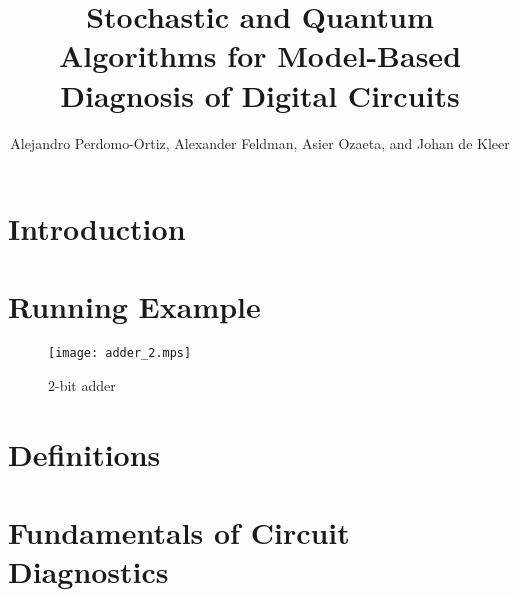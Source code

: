 \documentclass{article}
\title{Stochastic and Quantum Algorithms for Model-Based Diagnosis of Digital Circuits}
\author{Alejandro Perdomo-Ortiz, Alexander Feldman, Asier Ozaeta, and Johan de Kleer}
\begin{document}
\maketitle
\section{Introduction}
\section{Running Example}

\begin{figure}[htb]
\centering
\texttt{[image: adder\_2.mps]}
\caption{$2$-bit adder\label{fig:adder}}
\end{figure}

\section{Definitions}

\begin{definition}
\end{definition}

\begin{definition}
\end{definition}

\begin{definition}[observation]
\end{definition}

\begin{definition}[diagnosis]
\end{definition}

\begin{definition}
\end{definition}

\begin{definition}
\end{definition}

\begin{definition}
\end{definition}

\begin{definition}
\end{definition}

\section{Fundamentals of Circuit Diagnostics}
\end{document}
